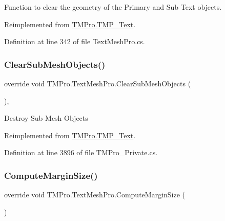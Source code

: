 Function to clear the geometry of the Primary and Sub Text objects. 



Reimplemented from \mbox{\hyperlink{class_t_m_pro_1_1_t_m_p___text_af3f756ddaf2d3f82ddddb27b6f66a15f}{T\+M\+Pro.\+T\+M\+P\+\_\+\+Text}}.



Definition at line 342 of file Text\+Mesh\+Pro.\+cs.

\mbox{\label{class_t_m_pro_1_1_text_mesh_pro_a7b6baf8afa783ff9a77d62fffe4073a6}} 
\subsubsection{\texorpdfstring{ClearSubMeshObjects()}{ClearSubMeshObjects()}}
{\footnotesize\ttfamily override void T\+M\+Pro.\+Text\+Mesh\+Pro.\+Clear\+Sub\+Mesh\+Objects (\begin{DoxyParamCaption}{ }\end{DoxyParamCaption})\hspace{0.3cm}{\ttfamily [protected]}, {\ttfamily [virtual]}}



Destroy Sub Mesh Objects 



Reimplemented from \mbox{\hyperlink{class_t_m_pro_1_1_t_m_p___text_a837eac6133a6ef0cdceb26db59c6ac19}{T\+M\+Pro.\+T\+M\+P\+\_\+\+Text}}.



Definition at line 3896 of file T\+M\+Pro\+\_\+\+Private.\+cs.

\mbox{\label{class_t_m_pro_1_1_text_mesh_pro_af98c43be93b6f588b2086aff6957197e}} 
\subsubsection{\texorpdfstring{ComputeMarginSize()}{ComputeMarginSize()}}
{\footnotesize\ttfamily override void T\+M\+Pro.\+Text\+Mesh\+Pro.\+Compute\+Margin\+Size (\begin{DoxyParamCaption}{ }\end{DoxyParamCaption})\hspace{0.3cm}{\ttfamily [virtual]}}



